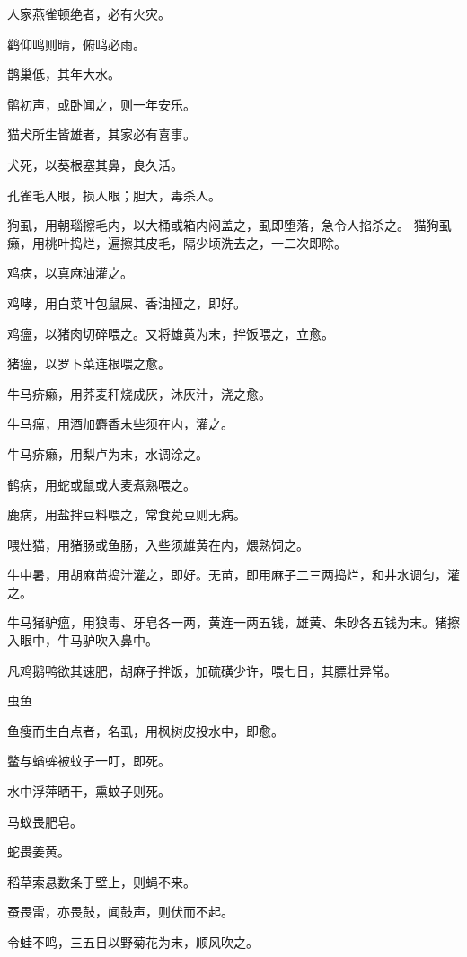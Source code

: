 \documentclass[a4paper,12pt,UTF8,twoside]{ctexbook}
\begin{document}
    人家燕雀顿绝者，必有火灾。
    
    鹳仰鸣则晴，俯鸣必雨。
    
    鹊巢低，其年大水。
    
    鹘初声，或卧闻之，则一年安乐。
    
    猫犬所生皆雄者，其家必有喜事。
    
    犬死，以葵根塞其鼻，良久活。
    
    孔雀毛入眼，损人眼；胆大，毒杀人。
    
    狗虱，用朝瑙擦毛内，以大桶或箱内闷盖之，虱即堕落，急令人掐杀之。 猫狗虱癞，用桃叶捣烂，遍擦其皮毛，隔少顷洗去之，一二次即除。
    
    鸡病，以真麻油灌之。
    
    鸡哮，用白菜叶包鼠屎、香油挜之，即好。
    
    鸡瘟，以猪肉切碎喂之。又将雄黄为末，拌饭喂之，立愈。
    
    猪瘟，以罗卜菜连根喂之愈。
    
    牛马疥癞，用荞麦秆烧成灰，沐灰汁，浇之愈。
    
    牛马瘟，用酒加麝香末些须在内，灌之。
    
    牛马疥癞，用梨卢为末，水调涂之。
    
    鹤病，用蛇或鼠或大麦煮熟喂之。
    
    鹿病，用盐拌豆料喂之，常食菀豆则无病。
    
    喂灶猫，用猪肠或鱼肠，入些须雄黄在内，煨熟饲之。
    
    牛中暑，用胡麻苗捣汁灌之，即好。无苗，即用麻子二三两捣烂，和井水调匀，灌之。
    
    牛马猪驴瘟，用狼毒、牙皂各一两，黄连一两五钱，雄黄、朱砂各五钱为末。猪擦入眼中，牛马驴吹入鼻中。
    
    凡鸡鹅鸭欲其速肥，胡麻子拌饭，加硫磺少许，喂七日，其膘壮异常。
    
    虫鱼
    
    鱼瘦而生白点者，名虱，用枫树皮投水中，即愈。
    
    鳖与蝤蛑被蚊子一叮，即死。
    
    水中浮萍晒干，熏蚊子则死。
    
    马蚁畏肥皂。
    
    蛇畏姜黄。
    
    稻草索悬数条于壁上，则蝇不来。
    
    蚕畏雷，亦畏鼓，闻鼓声，则伏而不起。
    
    令蛙不鸣，三五日以野菊花为末，顺风吹之。
    
\end{document}
